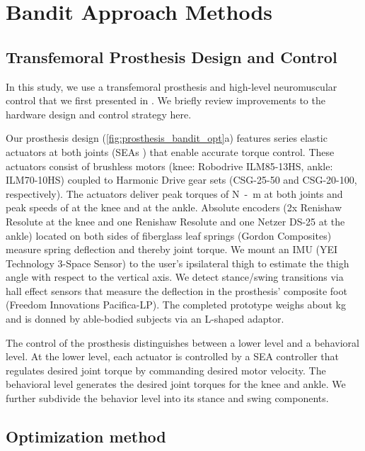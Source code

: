 \section{Bandit Approach Methods} 


\subsection{Transfemoral Prosthesis Design and Control}
In this study, we use a transfemoral prosthesis and high-level neuromuscular
control that we first presented in \citet{thatte2016toward}. We briefly review
improvements to the hardware design and control strategy here.

Our prosthesis design (\cref{fig:prosthesis_bandit_opt}a) features series
elastic actuators at both joints (SEAs \citep{pratt1995series}) that enable
accurate torque control. These actuators consist of brushless motors (knee:
Robodrive ILM85-13HS, ankle: ILM70-10HS) coupled to Harmonic Drive gear sets
(CSG-25-50 and CSG-20-100, respectively).  The actuators deliver peak torques of
\unit[170]{N-m} at both joints and peak speeds of  at the
knee and  at the ankle. Absolute encoders (2x Renishaw
Resolute at the knee and one Renishaw Resolute and one Netzer DS-25 at the
ankle) located on both sides of fiberglass leaf springs (Gordon Composites)
measure spring deflection and thereby joint torque. We mount an IMU (YEI
Technology 3-Space Sensor) to the user's ipsilateral thigh to estimate the thigh
angle with respect to the vertical axis.  We detect stance/swing transitions via
hall effect sensors that measure the deflection in the prosthesis' composite
foot (Freedom Innovations Pacifica-LP).  The completed prototype weighs about
\unit[6]{kg} and is donned by able-bodied subjects via an L-shaped adaptor.

The control of the prosthesis distinguishes between a lower level and a
behavioral level. At the lower level, each actuator is controlled by a SEA
controller \citep{schepelmann2012development} that regulates desired joint
torque by commanding desired motor velocity. The behavioral level generates the
desired joint torques for the knee and ankle. We further subdivide the behavior
level into its stance and swing components.

\subsection{Optimization method}\label{sec:bandit_optimization}

